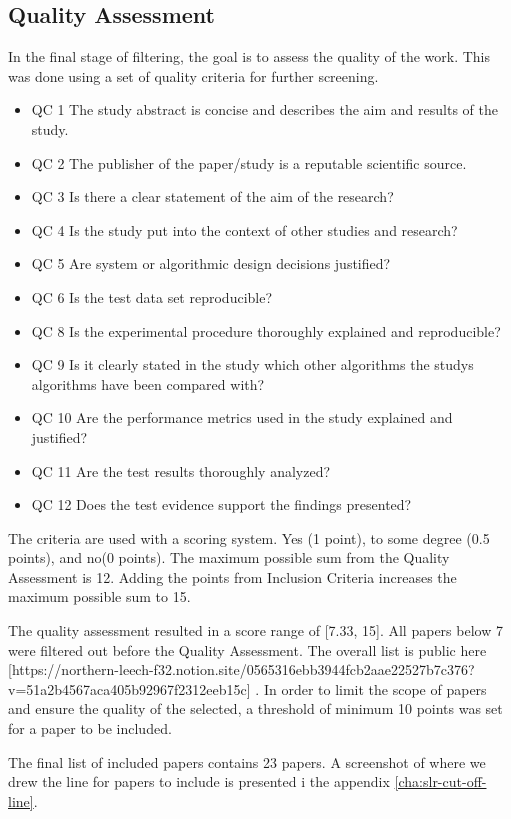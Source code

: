 \subsection{Quality Assessment}
In the final stage of filtering, the goal is to assess the quality of the work.
This was done using a set of quality criteria for further screening.
\begin{itemize}
  \item QC 1	The study abstract is concise and describes the aim and results of the study.
  \item QC 2	The publisher of the paper/study is a reputable scientific source.
  \item QC 3	Is there a clear statement of the aim of the research?
  \item QC 4	Is the study put into the context of other studies and research?
  \item QC 5	Are system or algorithmic design decisions justified?
  \item QC 6	Is the test data set reproducible?
  \item QC 8	Is the experimental procedure thoroughly explained and reproducible?
  \item QC 9	Is it clearly stated in the study which other algorithms the studys algorithms have been compared with?
  \item QC 10	Are the performance metrics used in the study explained and justified?
  \item QC 11	Are the test results thoroughly analyzed?
  \item QC 12 Does the test evidence support the findings presented?
\end{itemize}

The criteria are used with a scoring system.
Yes (1 point), to some degree (0.5 points), and no(0 points).
The maximum possible sum from the Quality Assessment is 12. Adding the points from Inclusion Criteria
increases the maximum possible sum to 15.

The quality assessment resulted in a score range of [7.33, 15]. All papers below 7 were filtered out before
the Quality Assessment.
The overall list is public here [https://northern-leech-f32.notion.site/0565316ebb3944fcb2aae22527b7c376?v=51a2b4567aca405b92967f2312eeb15c]
\cite{SLR-cutoff}.
In order to limit the scope of papers and ensure the quality of the selected, a threshold of minimum 10 points
was set for a paper to be included.

The final list of included papers contains 23 papers. A screenshot of where we drew the line for papers to include
is presented i the appendix \autoref{cha:slr-cut-off-line}.